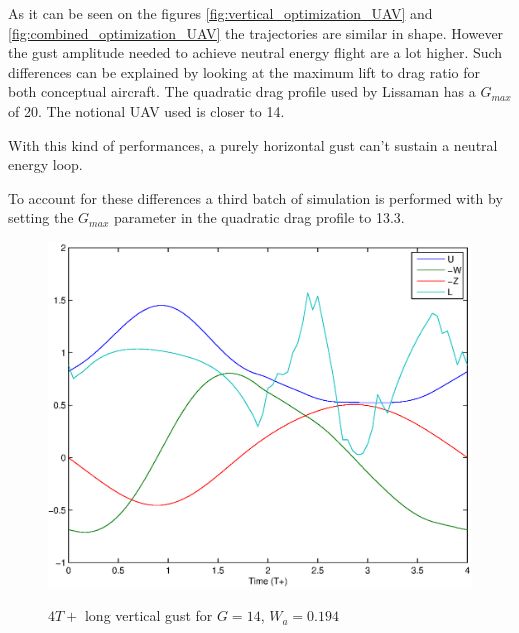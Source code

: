     As it can be seen on the figures \ref{fig:vertical_optimization_UAV} and \ref{fig:combined_optimization_UAV} the trajectories are similar in shape. However the gust amplitude needed to achieve neutral energy flight are a lot higher.
    Such differences can be explained by looking at the maximum lift to drag ratio for both conceptual aircraft.
    The quadratic drag profile used by Lissaman has a $G_{max}$ of 20.
    The notional UAV used is closer to 14.

    \FloatBarrier

    \par With this kind of performances, a purely horizontal gust can't sustain a neutral energy loop.


    \par To account for these differences a third batch of simulation is performed with by setting the $G_{max}$ parameter in the quadratic drag profile to 13.3.

    \begin{figure}[ht]
      \begin{center}
	\scalebox{0.8}
	{\includegraphics{./Figures/Windtype=1_Tg=4_Wg=0p194_quad_G=13.eps}}
      \end{center}
      \caption{$4T+$ long vertical gust for $G=14$, $W_a=0.194$}
      \label{fig:vertical_optimization_UAV_modified}
    \end{figure}


